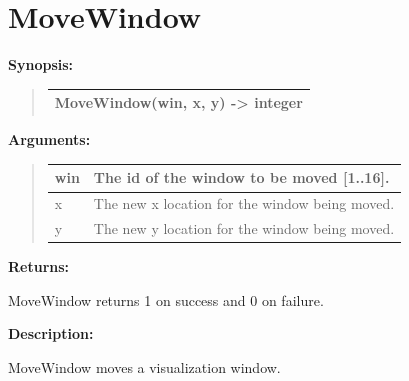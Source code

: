 \documentclass[letterpaper,10pt,english]{sphinxmanual}
\begin{document}
\section{MoveWindow}
\label{functions:movewindow}
\begin{DUlineblock}{0em}
\item[] \textbf{Synopsis:}
\end{DUlineblock}
\begin{quote}

\begin{tabulary}{\linewidth}{|L|}
\hline

MoveWindow(win, x, y) -\textgreater{} integer
\\
\hline\end{tabulary}

\end{quote}

\begin{DUlineblock}{0em}
\item[] 
\item[] \textbf{Arguments:}
\end{DUlineblock}
\begin{quote}

\begin{tabulary}{\linewidth}{|L|L|}
\hline

win
 & 
The id of the window to be moved {[}1..16{]}.
\\
\hline
x
 & 
The new x location for the window being moved.
\\
\hline
y
 & 
The new y location for the window being moved.
\\
\hline\end{tabulary}

\end{quote}

\begin{DUlineblock}{0em}
\item[] 
\item[] \textbf{Returns:}
\item[] MoveWindow returns 1 on success and 0 on failure.
\item[] 
\item[] \textbf{Description:}
\item[] MoveWindow moves a visualization window.
\end{DUlineblock}

\begin{DUlineblock}{0em}
\item[] 
\end{DUlineblock}
\end{document}
